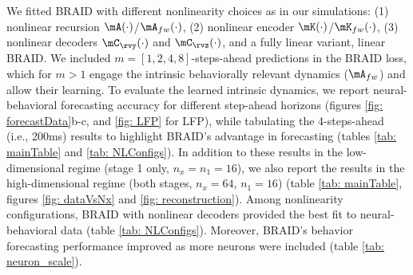 \documentclass{article} %
\newcommand{\ourmethod}{BRAID}
\newcommand{\ourmethodlinear}{linear \ourmethod}
\begin{document}

We fitted \ourmethod{} with different nonlinearity choices as in our simulations: (1) nonlinear recursion $\mA(\cdot)$/$\mA_{fw}(\cdot)$, (2) nonlinear encoder $\mK(\cdot)$/$\mK_{fw}(\cdot)$, (3) nonlinear decoders $\mC_{\rvy}(\cdot)$ and $\mC_{\rvz}(\cdot)$, and a fully linear variant, \ourmethodlinear{}. We included \(m\!=\![1,2,4,8]\)-steps-ahead predictions in the \ourmethod{} loss, which for \(m>1\) engage the intrinsic behaviorally relevant dynamics (\(\mA_{fw}\)) and allow their learning. To evaluate the learned intrinsic dynamics, we report neural-behavioral forecasting accuracy for different step-ahead horizons (figures \ref{fig: forecastData}b-c, and \ref{fig: LFP} for LFP), while tabulating the 4-steps-ahead (i.e., 200ms) results to highlight \ourmethod{}'s advantage in forecasting (tables \ref{tab: mainTable} and \ref{tab: NLConfigs}). In addition to these results in the low-dimensional regime (stage 1 only, \(n_x\!=\!n_1\!=\!16\)), we also report the results in the high-dimensional regime (both stages, \(n_x\!=\!64\), \(n_1\!=\!16\)) (table \ref{tab: mainTable}, figures \ref{fig: dataVsNx} and \ref{fig: reconstruction}). Among nonlinearity configurations, \ourmethod{} with nonlinear decoders provided the best fit to neural-behavioral data (table \ref{tab: NLConfigs}). Moreover, \ourmethod{}'s behavior forecasting performance improved as more neurons were included (table \ref{tab: neuron_scale}). %
\end{document}
